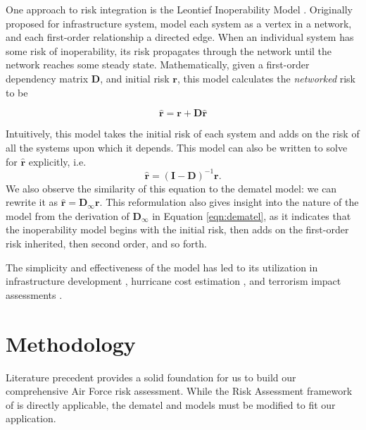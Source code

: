 \documentclass{article}
\begin{document}
One approach to risk integration is the Leontief Inoperability Model \citep{haimes-iiom}. Originally proposed for infrastructure system, \citeauthor{haimes-iiom} model each system as a vertex in a network, and each first-order relationship a directed edge. When an individual system has some risk of inoperability, its risk propagates through the network until the network reaches some steady state. Mathematically, given a first-order dependency matrix $\mathbf{D}$, and initial risk $\mathbf{r}$, this model calculates the \emph{networked} risk to be 

\begin{equation}
\hat{\mathbf{r}} = \mathbf{r} + \mathbf{D} \hat{\mathbf{r}}
\end{equation}

Intuitively, this model takes the initial risk of each system and adds on the risk of all the systems upon which it depends. This model can also be written to solve for $\hat{\mathbf{r}}$ explicitly, i.e. 
\begin{equation}
\label{eqn:lin}
\hat{\mathbf{r}} = (\mathbf{I}-\mathbf{D})^{-1} \mathbf{r}.
\end{equation}
We also observe the similarity of this equation to the \ac{dematel} model: we can rewrite it as $\hat{\mathbf{r}} = \mathbf{D}_\infty \mathbf{r}$. This reformulation also gives insight into the nature of the model from the derivation of $\mathbf{D}_\infty$ in Equation \ref{eqn:dematel}, as it indicates that the inoperability model begins with the initial risk, then adds on the first-order risk inherited, then second order, and so forth.

The simplicity and effectiveness of the \citeauthor{haimes-iiom} model has led to its utilization in infrastructure development \citep{iiom-infrastructure}, hurricane cost estimation \citep{iiom-katrina}, and terrorism impact assessments \citep{iiom-terrorism}. 

\section{Methodology}

Literature precedent provides a solid foundation for us to build our comprehensive Air Force risk assessment. While the Risk Assessment framework of \citet{gallagher2016improving} is directly applicable, the \ac{dematel} and \citet{haimes-iiom} models must be modified to fit our application.
\end{document}
